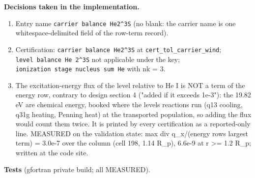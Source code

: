 \documentclass[english,a4paper]{my_memo}
\providecommand{\tightlist}{\setlength{\itemsep}{0pt}\setlength{\parskip}{0pt}}
\begin{document}
\textbf{Decisions taken in the implementation.}

\begin{enumerate}
\def\labelenumi{\arabic{enumi}.}
\tightlist
\item
  Entry name \texttt{carrier\ balance\ He2\^{}3S} (no blank: the carrier name is one
  whitespace-delimited field of the row-term record).
\item
  Certification: \texttt{carrier\ balance\ He2\^{}3S} at \texttt{cert\_tol\_carrier\_wind};
  \texttt{level\ balance\ He\ 2\^{}3S} not applicable under the key;
  \texttt{ionization\ stage\ nucleus\ sum\ He} with nk = 3.
\item
  The excitation-energy flux of the level relative to He I is NOT a term
  of the energy row, contrary to design section 4 ("added if it exceeds
  1e-3"): the 19.82 eV are chemical energy, booked where the level\textquotesingle s
  reactions run (q13 cooling, q31g heating, Penning heat) at the
  transported population, so adding the flux would count them twice. It
  is printed by every certification as a reported-only line. MEASURED on
  the validation state: max \textbar div q\_x\textbar/(energy row\textquotesingle s largest term) =
  3.0e-7 over the column (cell 198, 1.14 R\_p), 6.6e-9 at r \textgreater= 1.2 R\_p;
  written at the code site.
\end{enumerate}

\textbf{Tests} (gfortran private build; all MEASURED).
\end{document}
